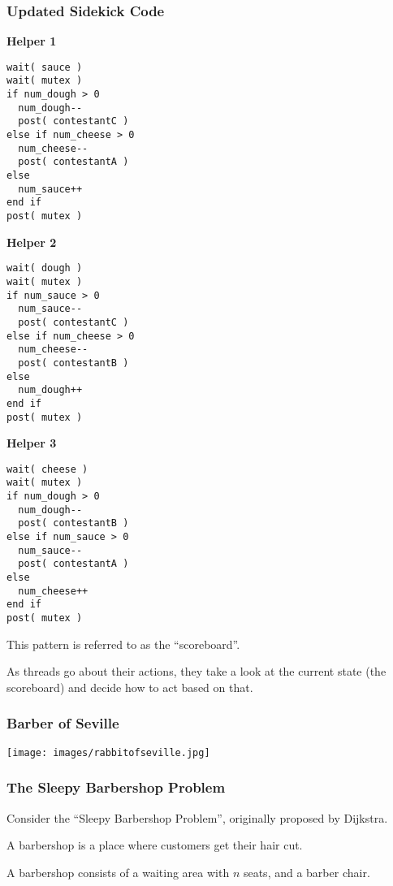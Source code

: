 \begin{frame}[fragile]
	\frametitle{Updated Sidekick Code}

	\begin{multicols}{3}
		\textbf{Helper 1}
		\begin{lstlisting}
wait( sauce )
wait( mutex )
if num_dough > 0  
  num_dough--
  post( contestantC )
else if num_cheese > 0
  num_cheese--
  post( contestantA )
else
  num_sauce++
end if  
post( mutex )
\end{lstlisting}
		\columnbreak
		\textbf{Helper 2}
		\begin{lstlisting}
wait( dough )
wait( mutex )
if num_sauce > 0  
  num_sauce--
  post( contestantC )
else if num_cheese > 0
  num_cheese--
  post( contestantB )
else
  num_dough++
end if  
post( mutex )
\end{lstlisting}
		\columnbreak
		\textbf{Helper 3}
		\begin{lstlisting}
wait( cheese )
wait( mutex )
if num_dough > 0 
  num_dough--
  post( contestantB )
else if num_sauce > 0
  num_sauce--
  post( contestantA )
else
  num_cheese++
end if  
post( mutex )
\end{lstlisting}
	\end{multicols}

	This pattern is referred to as the ``scoreboard''.

	As threads go about their actions, they take a look at the current state (the scoreboard) and decide how to act based on that.

\end{frame}

\begin{frame}
	\frametitle{Barber of Seville}

	\begin{center}
		\texttt{[image: images/rabbitofseville.jpg]}
	\end{center}

\end{frame}

\begin{frame}
	\frametitle{The Sleepy Barbershop Problem}

	Consider the ``Sleepy Barbershop Problem'', originally proposed by Dijkstra.

	A barbershop is a place where customers get their hair cut.

	A barbershop consists of a waiting area with $n$ seats, and a barber chair.

\end{frame}



